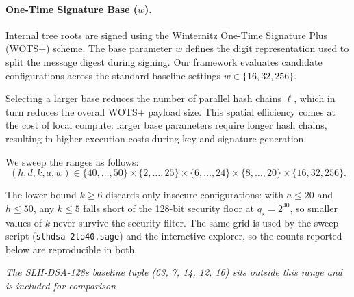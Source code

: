 \paragraph{One-Time Signature Base ($w$).}
Internal tree roots are signed using the Winternitz One-Time Signature Plus (WOTS+) scheme. The base parameter $w$ defines the digit representation used to split the message digest during signing. Our framework evaluates candidate configurations across the standard baseline settings $w \in \{16, 32, 256\}$.

Selecting a larger base reduces the number of parallel hash chains $\ell$, which in turn reduces the overall WOTS+ payload size. This spatial efficiency comes at the cost of local compute: larger base parameters require longer hash chains, resulting in higher execution costs during key and signature generation.

We sweep the ranges as follows:
\begin{equation*}
    (h, d, k, a, w) \in \{40, \dots, 50\} \times \{2, \dots, 25\} \times \{6, \dots, 24\} \times \{8, \dots, 20\} \times \{16, 32, 256\}.
\end{equation*}

The lower bound $k \geq 6$ discards only insecure configurations: with $a \leq 20$ and $h \leq 50$, any $k \leq 5$ falls short of the 128-bit security floor at $q_s = 2^{40}$, so smaller values of $k$ never survive the security filter. The same grid is used by the sweep script (\texttt{slhdsa-2to40.sage}) and the interactive explorer, so the counts reported below are reproducible in both.

\textit{The SLH-DSA-128s baseline tuple (63, 7, 14, 12, 16) sits outside this range and is included for comparison}